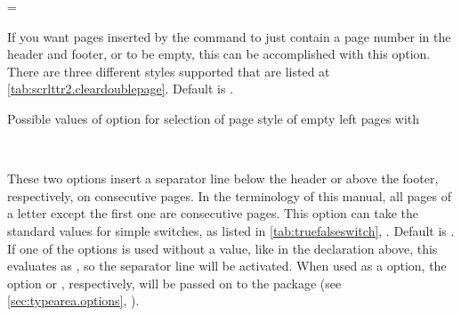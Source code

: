 \begin{Declaration}
  =
\end{Declaration}
%
If you want pages inserted by the  command to
just contain a page number in the header and footer, or to be empty,
this can be accomplished with this option. There are three different
styles supported that are listed at
\autoref{tab:scrlttr2.cleardoublepage}. Default is .

\begin{table}
  \caption[{Possible values of option  with
    }]{Possible values of option  for
    selection of page style of empty left pages with }
  \label{tab:scrlttr2.cleardoublepage}
  \begin{desctabular}
  \end{desctabular}
\end{table}
%
%

\begin{Declaration}
  \\
\end{Declaration}
%
%
These two options insert a separator line below the header or above
the footer, respectively, on consecutive pages. In the terminology of
this manual, all pages of a letter except the first one are
consecutive pages.  This option can take the standard values for
simple switches, as listed in
\autoref{tab:truefalseswitch},
. Default is
. If one of the options is used without a value, like in
the declaration above, this evaluates as , so the
separator line will be activated. When used as a 
option, the option  or ,
respectively, will be passed on to the  package (see
\autoref{sec:typearea.options},
).
%
%
%


